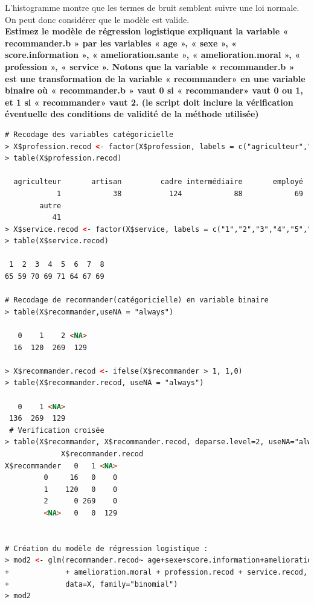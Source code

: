 L'histogramme montre que les termes de bruit semblent suivre une loi normale. On peut donc considérer que le modèle est valide.\newline
\\
\textbf{Estimez le modèle de régression logistique expliquant la variable « recommander.b » par les variables « age », « sexe », « score.information », « amelioration.sante », « amelioration.moral », « profession »,  « service ».  Notons que la variable « recommander.b » est une transformation de la variable « recommander» en une variable binaire où « recommander.b » vaut 0 si « recommander» vaut 0 ou 1, et 1 si « recommander» vaut 2. (le script doit inclure la vérification éventuelle des conditions de validité de la méthode utilisée)}

\begin{lstlisting}[language=html]
# Recodage des variables catégoricielle 
> X$profession.recod <- factor(X$profession, labels = c("agriculteur","artisan","cadre","intermédiaire","employé","ouvrier","sans emploi","autre"))
> table(X$profession.recod)

  agriculteur       artisan         cadre intermédiaire       employé       ouvrier   sans emploi 
            1            38           124            88            69            44            22 
        autre 
           41 
> X$service.recod <- factor(X$service, labels = c("1","2","3","4","5","6","7","8"))
> table(X$service.recod)

 1  2  3  4  5  6  7  8 
65 59 70 69 71 64 67 69 

# Recodage de recommander(catégoricielle) en variable binaire 
> table(X$recommander,useNA = "always")

   0    1    2 <NA> 
  16  120  269  129 

> X$recommander.recod <- ifelse(X$recommander > 1, 1,0)
> table(X$recommander.recod, useNA = "always")

   0    1 <NA> 
 136  269  129 
 # Verification croisée
> table(X$recommander, X$recommander.recod, deparse.level=2, useNA="always")
             X$recommander.recod
X$recommander   0   1 <NA>
         0     16   0    0
         1    120   0    0
         2      0 269    0
         <NA>   0   0  129


# Création du modèle de régression logistique :
> mod2 <- glm(recommander.recod~ age+sexe+score.information+amelioration.sante
+             + amelioration.moral + profession.recod + service.recod,
+             data=X, family="binomial")
> mod2


\end{lstlisting}

